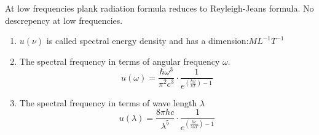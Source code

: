   At low frequencies plank radiation formula reduces to Reyleigh-Jeans formula. No descrepency at low  frequencies.
  \begin{note}
  	\begin{enumerate}
  		\item $u(\nu)$ is called spectral energy density and has a dimension:\quad $M L^{-1} T^{-1}$
  		\item The spectral frequency in terms of angular frequency $\omega$.\\
  		$$u(\omega)=\frac{\hbar \omega^{3}}{\pi^{2} c^{3}} \cdot \frac{1}{e^{\left(\frac{\hbar \omega}{k T}\right)-1}} $$
  		\item The spectral frequency in terms of wave length $\lambda$
  		$$ u(\lambda)=\frac{8 \pi h c}{\lambda^{5}} \cdot \frac{1}{e^ {\left(\frac{h c}{\lambda k T}\right)-1}}$$
  	\end{enumerate}
  \end{note}
